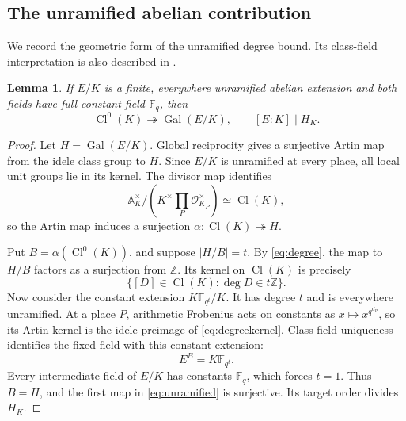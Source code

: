 \documentclass[12pt,onecolumn,draftclsnofoot,letterpaper]{IEEEtran}
\newtheorem{lemma}{Lemma}
\theoremstyle{remark}
\newcommand{\F}{\mathbb F}
\newcommand{\Z}{\mathbb Z}
\newcommand{\A}{\mathbb A}
\newcommand{\Gal}{\operatorname{Gal}}
\newcommand{\Cl}{\operatorname{Cl}}
\begin{document}
\subsection{The unramified abelian contribution}
We record the geometric form of the unramified degree bound. Its class-field interpretation is also described in \cite[Introduction]{genus}.
\begin{lemma}\label{lem:unramified}
If $E/K$ is a finite, everywhere unramified abelian extension and both fields have full constant field $\F_q$, then
\begin{equation}
 \Cl^0(K)\twoheadrightarrow\Gal(E/K),\qquad
 [E:K]\mid H_K.
 \label{eq:unramified}
\end{equation}
\end{lemma}
\begin{proof}
Let $H=\Gal(E/K)$. Global reciprocity gives a surjective Artin map from the idele class group to $H$. Since $E/K$ is unramified at every place, all local unit groups lie in its kernel. The divisor map identifies
\[
 \A_K^\times\big/\left(K^\times\prod_P\mathcal O_{K_P}^\times\right)
 \simeq\Cl(K),
\]
so the Artin map induces a surjection $\alpha:\Cl(K)\twoheadrightarrow H$.

Put $B=\alpha(\Cl^0(K))$, and suppose $|H/B|=t$. By \eqref{eq:degree}, the map to $H/B$ factors as a surjection from $\Z$. Its kernel on $\Cl(K)$ is precisely
\begin{equation}
 \{[D]\in\Cl(K):\deg D\in t\Z\}.
 \label{eq:degreekernel}
\end{equation}
Now consider the constant extension $K\F_{q^t}/K$. It has degree $t$ and is everywhere unramified. At a place $P$, arithmetic Frobenius acts on constants as $x\mapsto x^{q^{d_P}}$, so its Artin kernel is the idele preimage of \eqref{eq:degreekernel}. Class-field uniqueness identifies the fixed field with this constant extension:
\begin{equation}
 E^B=K\F_{q^t}.
 \label{eq:constantquotient}
\end{equation}
Every intermediate field of $E/K$ has constants $\F_q$, which forces $t=1$. Thus $B=H$, and the first map in \eqref{eq:unramified} is surjective. Its target order divides $H_K$.
\end{proof}
\end{document}
